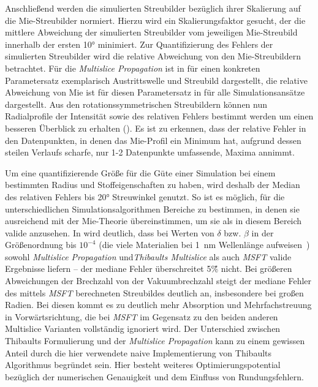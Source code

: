 Anschließend werden die simulierten Streubilder bezüglich ihrer Skalierung auf die Mie-Streubilder normiert. Hierzu wird ein Skalierungsfaktor gesucht, der die mittlere Abweichung der simulierten Streubilder vom jeweiligen Mie-Streubild innerhalb der ersten 10° minimiert. Zur Quantifizierung des Fehlers der simulierten Streubilder wird die relative Abweichung von den Mie-Streubildern betrachtet. Für die \textit{Multislice Propagation} ist in  für einen konkreten Parametersatz exemplarisch Austrittswelle und Streubild dargestellt, die relative Abweichung von Mie ist für diesen Parametersatz in  für alle Simulationsansätze dargestellt. Aus den rotationssymmetrischen Streubildern können nun Radialprofile der Intensität sowie des relativen Fehlers bestimmt werden um einen besseren Überblick zu erhalten (). Es ist zu erkennen, dass der relative Fehler in den Datenpunkten, in denen das Mie-Profil ein Minimum hat, aufgrund dessen steilen Verlaufs scharfe, nur 1-2 Datenpunkte umfassende, Maxima annimmt.

Um eine quantifizierende Größe für die Güte einer Simulation bei einem bestimmten Radius und Stoffeigenschaften zu haben, wird deshalb der Median des relativen Fehlers bis 20° Streuwinkel genutzt. So ist es möglich, für die unterschiedlichen Simulationsalgorithmen Bereiche zu bestimmen, in denen sie ausreichend mit der Mie-Theorie übereinstimmen, um sie als in diesem Bereich valide anzusehen. In  wird deutlich, dass bei Werten von $\delta$ bzw. $\beta$ in der Größenordnung bis $10^{-4}$ (die viele Materialien bei \SI{1}{nm} Wellenlänge aufweisen~\cite{henke}) sowohl \textit{Multislice Propagation} und\textit{Thibaults Multislice} als auch \textit{MSFT} valide Ergebnisse liefern -- der mediane Fehler überschreitet 5\~\% nicht. Bei größeren Abweichungen der Brechzahl von der Vakuumbrechzahl steigt der mediane Fehler des mittels \textit{MSFT} berechneten Streubildes deutlich an, insbesondere bei großen Radien. Bei diesen kommt es zu deutlich mehr Absorption und Mehrfachstreuung in Vorwärtsrichtung, die bei \textit{MSFT} im Gegensatz zu den beiden anderen Multislice Varianten vollständig ignoriert wird. Der Unterschied zwischen Thibaults Formulierung und der \textit{Multislice Propagation} kann zu einem gewissen Anteil durch die hier verwendete naive Implementierung von Thibaults Algorithmus begründet sein. Hier besteht weiteres Optimierungspotential bezüglich der numerischen Genauigkeit und dem Einfluss von Rundungsfehlern.

